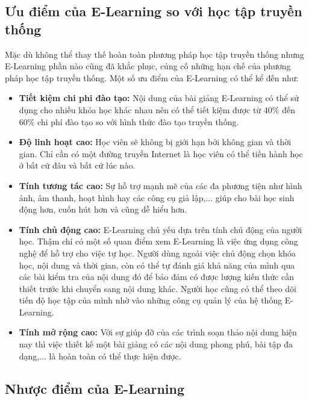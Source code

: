 \newpage

\subsection{Ưu điểm của E-Learning so với học tập truyền thống}

	Mặc dù không thể thay thế hoàn toàn phương pháp học tập truyền thống nhưng E-Learning phần nào cũng đã khắc phục, củng cố những hạn chế của phương pháp học tập truyền thống. Một số ưu điểm của E-Learning có thể kể đến như:

	\begin{itemize}
		
		\item \textbf{Tiết kiệm chi phi đào tạo:} Nội dung của bài giảng E-Learning có thể sử dụng cho nhiều khóa học khác nhau nên có thể tiết kiệm được từ 40\% đến 60\% chi phí đào tạo so với hình thức đào tạo truyền thống.
	
		\item \textbf{Độ linh hoạt cao:} Học viên sẽ không bị giới hạn bởi không gian và thời gian. Chỉ cần có một đường truyền Internet là học viên có thể tiến hành học ở bất cứ đâu và bất cứ lúc nào.
	
		\item \textbf{Tính tương tác cao:} Sự hỗ trợ mạnh mẽ của các đa phương tiện như hình ảnh, âm thanh, hoạt hình hay các công cụ giả lập,... giúp cho bài học sinh động hơn, cuốn hút hơn và cũng dễ hiểu hơn.
	
		\item \textbf{Tính chủ động cao:} E-Learning chủ yếu dựa trên tính chủ động của người học. Thậm chí có một số quan điểm xem E-Learning là việc ứng dụng công nghệ để hỗ trợ cho việc tự học. Người dùng ngoài việc chủ động chọn khóa học, nội dung và thời gian, còn có thể tự đánh giá khả năng của mình qua các bài kiểm tra của nội dung đó để bảo đảm có được lượng kiến thức cần thiết trước khi chuyển sang nội dung khác. Người học cũng có thể theo dõi tiến độ học tập của mình nhờ vào những công cụ quản lý của hệ thống E-Learning.
	
		\item \textbf{Tính mở rộng cao:} Với sự giúp đỡ của các trình soạn thảo nội dung hiện nay thì việc thiết kế một bài giảng có các nội dung phong phú, bài tập đa dạng,... là hoàn toàn có thể thực hiện được.
	
	\end{itemize}


\subsection{Nhược điểm của E-Learning}
	
